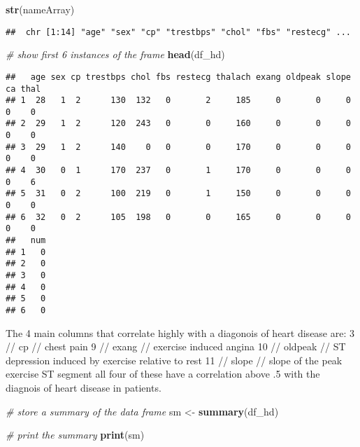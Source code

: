 \documentclass[]{article}
\newenvironment{Shaded}{\begin{snugshade}}{\end{snugshade}}
\newcommand{\KeywordTok}[1]{\textcolor[rgb]{0.13,0.29,0.53}{\textbf{#1}}}
\newcommand{\StringTok}[1]{\textcolor[rgb]{0.31,0.60,0.02}{#1}}
\newcommand{\CommentTok}[1]{\textcolor[rgb]{0.56,0.35,0.01}{\textit{#1}}}
\newcommand{\NormalTok}[1]{#1}
\begin{document}
\begin{Shaded}
\begin{Highlighting}[]
\KeywordTok{str}\NormalTok{(nameArray)}
\end{Highlighting}
\end{Shaded}

\begin{verbatim}
##  chr [1:14] "age" "sex" "cp" "trestbps" "chol" "fbs" "restecg" ...
\end{verbatim}

\begin{Shaded}
\begin{Highlighting}[]
\CommentTok{# show first 6 instances of the frame}
\KeywordTok{head}\NormalTok{(df_hd)}
\end{Highlighting}
\end{Shaded}

\begin{verbatim}
##   age sex cp trestbps chol fbs restecg thalach exang oldpeak slope ca thal
## 1  28   1  2      130  132   0       2     185     0       0     0  0    0
## 2  29   1  2      120  243   0       0     160     0       0     0  0    0
## 3  29   1  2      140    0   0       0     170     0       0     0  0    0
## 4  30   0  1      170  237   0       1     170     0       0     0  0    6
## 5  31   0  2      100  219   0       1     150     0       0     0  0    0
## 6  32   0  2      105  198   0       0     165     0       0     0  0    0
##   num
## 1   0
## 2   0
## 3   0
## 4   0
## 5   0
## 6   0
\end{verbatim}

The 4 main columns that correlate highly with a diagonois of heart
disease are: 3 // cp // chest pain 9 // exang // exercise induced angina
10 // oldpeak // ST depression induced by exercise relative to rest 11
// slope // slope of the peak exercise ST segment all four of these have
a correlation above .5 with the diagnois of heart disease in patients.

\begin{Shaded}
\begin{Highlighting}[]
\CommentTok{# store a summary of the data frame}
\NormalTok{sm <-}\StringTok{ }\KeywordTok{summary}\NormalTok{(df_hd)}

\CommentTok{# print the summary}
\KeywordTok{print}\NormalTok{(sm)}
\end{Highlighting}
\end{Shaded}
\end{document}
